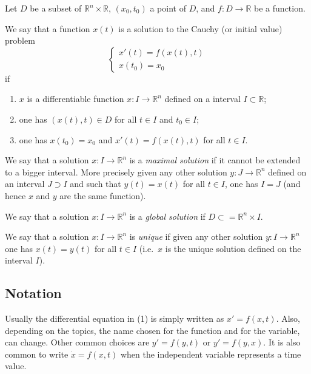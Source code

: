 \documentclass[12pt]{article}
\newcommand{\R}{\mathbb R}
\begin{document}
Let $D$ be a subset of $\R^n\times \R$, $(x_0,t_0)$ a point of $D$, and $f\colon D\to \R$ be a function.

We say that a function $x(t)$ is a solution to the Cauchy (or initial value) problem
\begin{equation}
\begin{cases}
x'(t)=f(x(t),t)\\
x(t_0)=x_0
\end{cases}
\end{equation} 
if
\begin{enumerate}
\item $x$ is a differentiable function $x\colon I\to \R^n$ defined on a interval $I\subset \R$;
\item one has $(x(t),t)\in D$ for all $t\in I$ and $t_0\in I$;
\item one has $x(t_0)=x_0$ and $x'(t)=f(x(t),t)$ for all $t\in I$.
\end{enumerate}

We say that a solution $x\colon I\to\R^n$ is a \emph{maximal solution} if it cannot be extended to a bigger interval. More precisely given any other solution $y\colon J\to \R^n$ defined on an interval $J\supset I$ and such that $y(t)=x(t)$ for all $t\in I$, one has $I=J$ (and hence $x$ and $y$ are the same function).

We say that a solution $x\colon I\to\R^n$ is a \emph{global solution} if $D\subset=\R^n \times I$. 

We say that a solution $x\colon I\to\R^n$ is \emph{unique} if given any other solution $y\colon I\to\R^n$ one has $x(t)=y(t)$ for all $t\in I$ (i.e.\ $x$ is the unique solution defined on the interval $I$).

\subsection{Notation}
Usually the differential equation in (1) is simply written as $x'=f(x,t)$. 
Also, depending on the topics, the name chosen for the function and for the variable, can change. Other common choices are $y'=f(y,t)$ or $y'=f(y,x)$.
It is also common to write $\dot x=f(x,t)$ when the independent variable represents a time value.
\end{document}
